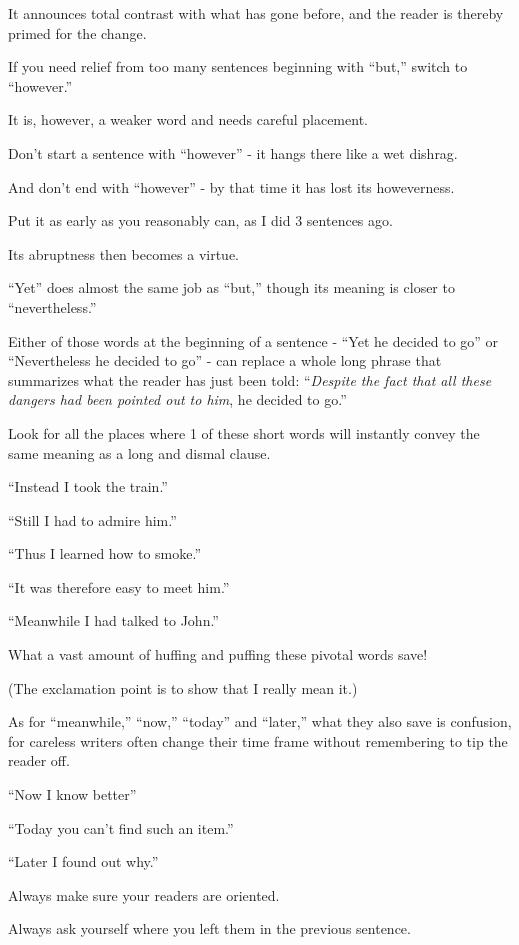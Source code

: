 \documentclass{book}
\numberwithin{equation}{section}
\begin{document}
It announces total contrast with what has gone before, and the reader is thereby primed for the change.

If you need relief from too many sentences beginning with ``but,'' switch to ``however.''

It is, however, a weaker word and needs careful placement.

Don't start a sentence with ``however'' - it hangs there like a wet dishrag.

And don't end with ``however'' - by that time it has lost its howeverness.

Put it as early as you reasonably can, as I did 3 sentences ago.

Its abruptness then becomes a virtue.

%
``Yet'' does almost the same job as ``but,'' though its meaning is closer to ``nevertheless.''

Either of those words at the beginning of a sentence - ``Yet he decided to go'' or ``Nevertheless he decided to go'' - can replace a whole long phrase that summarizes what the reader has just been told: ``\textit{Despite the fact that all these dangers had been pointed out to him}, he decided to go.''

Look for all the places where 1 of these short words will instantly convey the same meaning as a long and dismal clause.

``Instead I took the train.''

``Still I had to admire him.''

``Thus I learned how to smoke.''

``It was therefore easy to meet him.''

``Meanwhile I had talked to John.''

What a vast amount of huffing and puffing these pivotal words save!

(The exclamation point is to show that I really mean it.)

%
As for ``meanwhile,'' ``now,'' ``today'' and ``later,'' what they also save is confusion, for careless writers often change their time frame without remembering to tip the reader off.

``Now I know better''

``Today you can't find such an item.''

``Later I found out why.''

Always make sure your readers are oriented.

Always ask yourself where you left them in the previous sentence.
\end{document}
